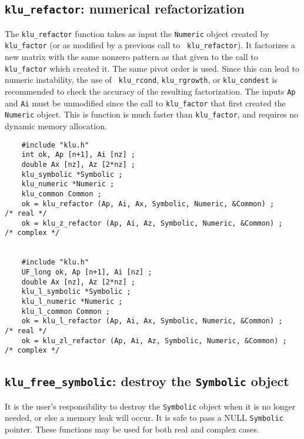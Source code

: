 \documentclass[11pt]{article}
\begin{document}
\subsection{{\tt klu\_refactor}: numerical refactorization}

The {\tt klu\_refactor} function takes as input the {\tt Numeric} object
created by {\tt klu\_factor} (or as modified by a previous call to {\tt
klu\_refactor}).  It factorizes a new matrix with the same nonzero pattern as
that given to the call to {\tt klu\_factor} which created it.  The same pivot
order is used.  Since this can lead to numeric instability, the use of {\tt
klu\_rcond}, {\tt klu\_rgrowth}, or {\tt klu\_condest} is recommended to check
the accuracy of the resulting factorization.  The inputs {\tt Ap} and {\tt Ai}
must be unmodified since the call to {\tt klu\_factor} that first created the
{\tt Numeric} object.  This is function is much faster than {\tt klu\_factor},
and requires no dynamic memory allocation.

{\footnotesize
\begin{verbatim}
    #include "klu.h"
    int ok, Ap [n+1], Ai [nz] ;
    double Ax [nz], Az [2*nz] ;
    klu_symbolic *Symbolic ;
    klu_numeric *Numeric ;
    klu_common Common ;
    ok = klu_refactor (Ap, Ai, Ax, Symbolic, Numeric, &Common) ;                      /* real */
    ok = klu_z_refactor (Ap, Ai, Az, Symbolic, Numeric, &Common) ;                    /* complex */


    #include "klu.h"
    UF_long ok, Ap [n+1], Ai [nz] ;
    double Ax [nz], Az [2*nz] ;
    klu_l_symbolic *Symbolic ;
    klu_l_numeric *Numeric ;
    klu_l_common Common ;
    ok = klu_l_refactor (Ap, Ai, Ax, Symbolic, Numeric, &Common) ;                    /* real */
    ok = klu_zl_refactor (Ap, Ai, Az, Symbolic, Numeric, &Common) ;                   /* complex */
\end{verbatim}
}

\subsection{{\tt klu\_free\_symbolic}: destroy the {\tt Symbolic} object}

It is the user's responsibility to destroy the {\tt Symbolic} object when it is
no longer needed, or else a memory leak will occur.  It is safe to pass a NULL
{\tt Symbolic} pointer.  These functions may be used for both real and complex
cases.
\end{document}
